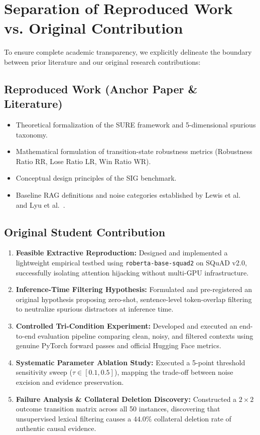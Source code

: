 \documentclass[conference]{IEEEtran}
\begin{document}
\section{Separation of Reproduced Work vs. Original Contribution}
To ensure complete academic transparency, we explicitly delineate the boundary between prior literature and our original research contributions:

\subsection{Reproduced Work (Anchor Paper \& Literature)}
\begin{itemize}
    \item Theoretical formalization of the SURE framework and 5-dimensional spurious taxonomy.
    \item Mathematical formulation of transition-state robustness metrics (Robustness Ratio $\text{RR}$, Lose Ratio $\text{LR}$, Win Ratio $\text{WR}$).
    \item Conceptual design principles of the SIG benchmark.
    \item Baseline RAG definitions and noise categories established by Lewis et al.~\cite{lewis2020rag} and Lyu et al.~\cite{lyu2024crud}.
\end{itemize}

\subsection{Original Student Contribution}
\begin{enumerate}
    \item \textbf{Feasible Extractive Reproduction:} Designed and implemented a lightweight empirical testbed using \texttt{roberta-base-squad2} on SQuAD v2.0, successfully isolating attention hijacking without multi-GPU infrastructure.
    \item \textbf{Inference-Time Filtering Hypothesis:} Formulated and pre-registered an original hypothesis proposing zero-shot, sentence-level token-overlap filtering to neutralize spurious distractors at inference time.
    \item \textbf{Controlled Tri-Condition Experiment:} Developed and executed an end-to-end evaluation pipeline comparing clean, noisy, and filtered contexts using genuine PyTorch forward passes and official Hugging Face metrics.
    \item \textbf{Systematic Parameter Ablation Study:} Executed a 5-point threshold sensitivity sweep ($\tau \in [0.1, 0.5]$), mapping the trade-off between noise excision and evidence preservation.
    \item \textbf{Failure Analysis \& Collateral Deletion Discovery:} Constructed a $2\times2$ outcome transition matrix across all 50 instances, discovering that unsupervised lexical filtering causes a $44.0\%$ collateral deletion rate of authentic causal evidence.
\end{enumerate}
\end{document}
